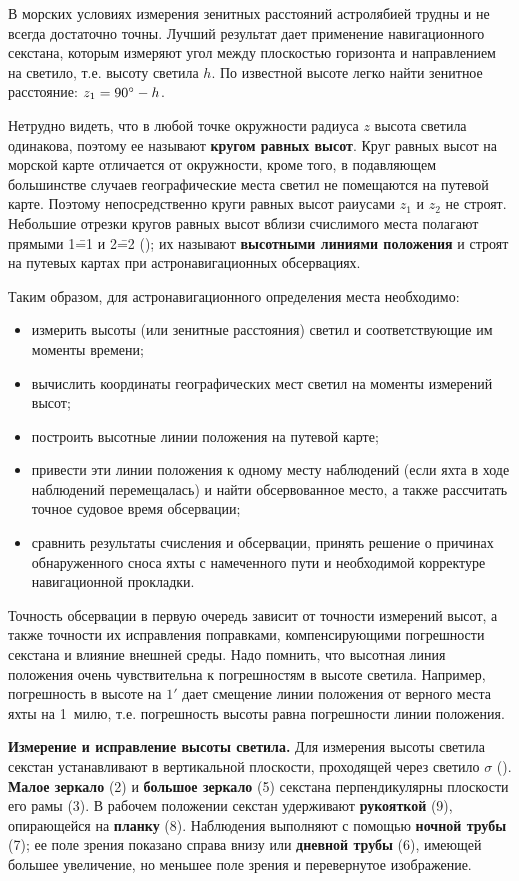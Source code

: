 В морских условиях измерения зенитных расстояний астролябией трудны и
не всегда достаточно точны. Лучший результат дает применение
навигационного секстана, которым измеряют угол между плоскостью
горизонта и направлением на светило, т.е. высоту светила $h$. По
известной высоте легко найти зенитное расстояние: $z_1 = 90^\circ - h$.

Нетрудно видеть, что в любой точке окружности радиуса $z$ высота светила
одинакова, поэтому ее называют \textbf{кругом равных высот}. Круг равных высот
на морской карте отличается от окружности, кроме того, в подавляющем
большинстве случаев географические места светил не помещаются на
путевой карте. Поэтому непосредственно круги равных высот раиусами $z_1$
и $z_2$ не строят. Небольшие отрезки кругов равных высот вблизи
счислимого места полагают прямыми 1\==1 и 2\==2 (); их называют
\textbf{высотными линиями положения} и строят на путевых картах при
астронавигационных обсервациях.

Таким образом, для астронавигационного определения места необходимо:

\begin{itemize}
\item измерить высоты (или зенитные расстояния) светил и
  соответствующие им моменты времени;
\item вычислить координаты географических мест светил на моменты
  измерений высот;
\item построить высотные линии положения на путевой карте;
\item привести эти линии положения к одному месту наблюдений (если
  яхта в ходе наблюдений перемещалась) и найти обсервованное место, а
  также рассчитать точное судовое время обсервации;
\item сравнить результаты счисления и обсервации, принять решение о
  причинах обнаруженного сноса яхты с намеченного пути и необходимой
  корректуре навигационной прокладки.
\end{itemize}

Точность обсервации в первую очередь зависит от точности измерений
высот, а также точности их исправления поправками, компенсирующими
погрешности секстана и влияние внешней среды. Надо помнить, что
высотная линия положения очень чувствительна к погрешностям в высоте
светила. Например, погрешность в высоте на $1'$ дает смещение линии
положения от верного места яхты на 1~милю, т.е. погрешность высоты
равна погрешности линии положения.

\textbf{Измерение и исправление высоты светила.} Для измерения высоты
светила секстан устанавливают в вертикальной плоскости, проходящей
через светило $\sigma$ (). \textbf{Малое зеркало} (2) и
\textbf{большое зеркало} (5) секстана перпендикулярны плоскости его
рамы (3). В рабочем положении секстан удерживают \textbf{рукояткой}
(9), опирающейся на \textbf{планку} (8). Наблюдения выполняют с
помощью \textbf{ночной трубы} (7); ее поле зрения показано справа
внизу или \textbf{дневной трубы} (6), имеющей большее увеличение, но
меньшее поле зрения и перевернутое изображение.

